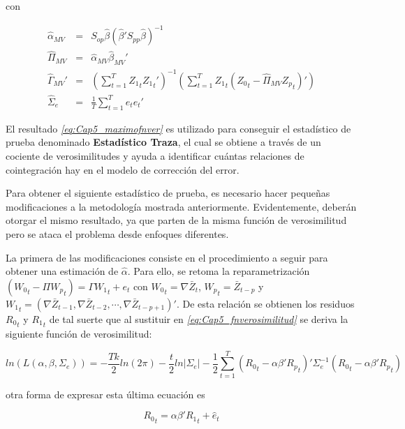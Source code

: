 con 

\begin{eqnarray}
\widehat{\alpha}_{MV} & = & S_{op}\widehat{\beta}(\widehat{\beta}'S_{pp}\widehat{\beta})^{-1} \nonumber \\
\widehat{\Pi}_{MV} &=& \widehat{\alpha}_{MV}\widehat{\beta}_{MV}' \nonumber\\
\widehat{\Gamma}_{MV}' &=& \left ( \sum_{t=1}^T {Z_1}_t{Z_1}_t' \right )^{-1}\left ( \sum_{t=1}^{T}{Z_1}_t\left ( {Z_0}_t-\widehat{\Pi}_{MV}{Z_p}_t \right )' \right ) \nonumber\\
\widehat{\Sigma}_{e} &=& \frac{1}{T}\sum_{t=1}^{T}e_te_t' \nonumber
\end{eqnarray}


El resultado \textit{\ref{eq:Cap5_maximofnver}} es utilizado para conseguir el estadístico de prueba denominado \textbf{Estadístico Traza}, el cual se obtiene a través de un cociente de verosimilitudes y ayuda a identificar cuántas relaciones de cointegración hay en el modelo de corrección del error.\bigskip 

Para obtener el siguiente estadístico de prueba, es necesario hacer pequeñas modificaciones a la metodología mostrada anteriormente. Evidentemente, deberán otorgar el mismo resultado, ya que parten de la misma función de verosimilitud pero se ataca el problema desde enfoques diferentes.\bigskip 

La primera de las modificaciones consiste en el procedimiento a seguir para obtener una estimación de $\widehat{\alpha}$. Para ello, se retoma la reparametrización  $\left ( {W_0}_t - \Pi {W_p}_t \right ) = \Gamma {W_1}_t +e_t$ con ${W_0}_t= \nabla \bar{Z}_t$, ${W_p}_t=\bar{Z}_{t-p}$ y $ {W_1}_t= ( \nabla \bar{Z}_{t-1}, \nabla \bar{Z}_{t-2},\cdots,\nabla \bar{Z}_{t-p+1})'$. De esta relación se obtienen los residuos ${R_0}_t$ y ${R_1}_t$ de tal suerte que al sustituir en \textit{\ref{eq:Cap5_fnverosimilitud}}  se deriva la siguiente función de verosimilitud:

\begin{equation}\label{fnverosimilitudenfoque2}
ln\left ( L(\alpha,\beta,\Sigma_e) \right )= -\frac{Tk}{2}ln(2\pi)-\frac{t}{2}ln\left | \Sigma_e \right |-\frac{1}{2}\sum_{t=1}^{T}\left ( {R_0}_t- \alpha\beta'{R_p}_t \right )'\Sigma_e^{-1}\left ( {R_0}_t- \alpha\beta'{R_p}_t   \right )
\end{equation}

otra forma de expresar esta última ecuación es 

\begin{equation}
{R_0}_t=\alpha\beta'{R_1}_t + \widehat{e}_t
\end{equation}

